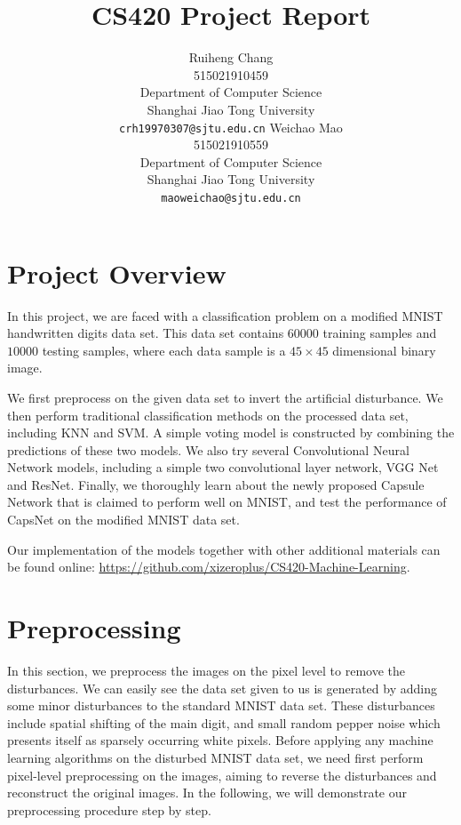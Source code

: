 \documentclass{article}
\title{CS420 Project Report}
\author{
  Ruiheng Chang \\
  515021910459\\
  Department of Computer Science\\
  Shanghai Jiao Tong University\\
  \texttt{crh19970307@sjtu.edu.cn}
  \And
  Weichao Mao \\
  515021910559\\
  Department of Computer Science\\
  Shanghai Jiao Tong University\\
  \texttt{maoweichao@sjtu.edu.cn}
}
\begin{document}

\maketitle

\section{Project Overview}

In this project, we are faced with a classification problem on a modified MNIST handwritten digits data set. This data set contains $60000$ training samples and $10000$ testing samples, where each data sample is a $45 \times 45$ dimensional binary image. 

We first preprocess on the given data set to invert the artificial disturbance. We then perform traditional classification methods on the processed data set, including KNN and SVM. A simple voting model is constructed by combining the predictions of these two models. We also try several Convolutional Neural Network models, including a simple two convolutional layer network, VGG Net and ResNet. Finally, we thoroughly learn about the newly proposed Capsule Network that is claimed to perform well on MNIST, and test the performance of CapsNet on the modified MNIST data set. 

Our implementation of the models together with other additional materials can be found online: \url{https://github.com/xizeroplus/CS420-Machine-Learning}.

\section{Preprocessing}
In this section, we preprocess the images on the pixel level to remove the disturbances. We can easily see the data set given to us is generated by adding some minor disturbances to the standard MNIST data set. These disturbances include spatial shifting of the main digit, and small random pepper noise which presents itself as sparsely occurring white pixels. Before applying any machine learning algorithms on the disturbed MNIST data set, we need first perform pixel-level preprocessing on the images, aiming to reverse the disturbances and reconstruct the original images. In the following, we will demonstrate our preprocessing procedure step by step.
\end{document}
